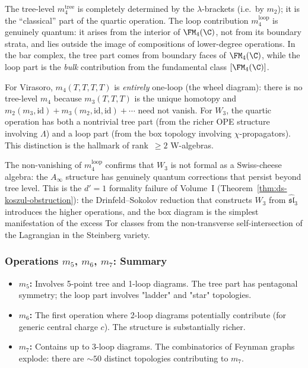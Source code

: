 \begin{remark}
\label{rem:tree-vs-loop}
The tree-level $m_4^{\mathrm{tree}}$ is completely determined
by the $\lambda$-brackets (i.e.\ by $m_2$); it is the
``classical'' part of the quartic operation. The loop
contribution $m_4^{\mathrm{loop}}$ is genuinely quantum: it
arises from the interior of $\FM_4(\C)$, not from its boundary
strata, and lies outside the image of compositions of lower-degree
operations. In the bar complex, the tree part comes from
boundary faces of $\FM_4(\C)$, while the loop part is the
\emph{bulk} contribution from the fundamental class
$[\FM_4(\C)]$.

For Virasoro, $m_4(T,T,T,T)$ is \emph{entirely} one-loop
(the wheel diagram): there is no tree-level $m_4$ because
$m_3(T,T,T)$ is the unique homotopy and $m_2(m_3, \mathrm{id})
+ m_3(m_2, \mathrm{id}, \mathrm{id}) + \cdots$ need not vanish.
For $W_3$, the quartic operation has both a nontrivial tree
part (from the richer OPE structure involving $\Lambda$) and
a loop part (from the box topology involving $\chi$-propagators).
This distinction is the hallmark of rank~$\ge 2$ W-algebras.
\end{remark}

\begin{remark}
\label{rem:m4-non-formality}
The non-vanishing of $m_4^{\mathrm{loop}}$ confirms that $W_3$
is not formal as a Swiss-cheese algebra: the $A_\infty$ structure
has genuinely quantum corrections that persist beyond tree level.
This is the $d' = 1$ formality failure of Volume~I
(Theorem~\ref{thm:ds-koszul-obstruction}): the Drinfeld--Sokolov
reduction that constructs $W_3$ from $\widehat{\mathfrak{sl}}_3$
introduces the higher operations, and the box diagram is the
simplest manifestation of the excess Tor classes from the
non-transverse self-intersection of the Lagrangian in the
Steinberg variety.
\end{remark}

\subsubsection{Operations $m_5$, $m_6$, $m_7$: Summary}

\begin{itemize}
\item \textbf{$m_5$:} Involves 5-point tree and 1-loop diagrams. The tree part has pentagonal symmetry; the loop part involves "ladder" and "star" topologies.

\item \textbf{$m_6$:} The first operation where 2-loop diagrams potentially contribute (for generic central charge $c$). The structure is substantially richer.

\item \textbf{$m_7$:} Contains up to 3-loop diagrams. The combinatorics of Feynman graphs explode: there are $\sim 50$ distinct topologies contributing to $m_7$.
\end{itemize}

